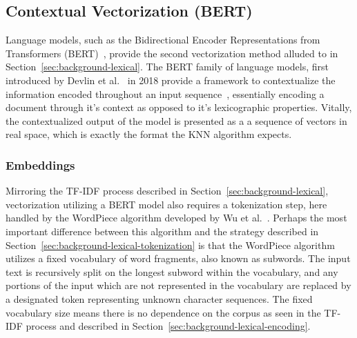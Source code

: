 \documentclass[11pt]{article}
\theoremstyle{plain}
\theoremstyle{definition}
\begin{document}
\subsection{Contextual Vectorization (BERT)}\label{sec:background-contextual}

Language models, such as the Bidirectional Encoder Representations from Transformers (BERT)~\cite{devlin/2018/bert}, provide the second vectorization method alluded to in Section~\ref{sec:background-lexical}. The BERT family of language models, first introduced by Devlin et al.\ \cite{devlin/2018/bert} in 2018 provide a framework to contextualize the information encoded throughout an input sequence~\cite{jurafsky/2026/speech}, essentially encoding a document through it's context as opposed to it's lexicographic properties. Vitally, the contextualized output of the model is presented as a a sequence of vectors in real space, which is exactly the format the KNN algorithm expects.

\subsubsection{Embeddings}\label{sec:background-contextual-embeddings}

Mirroring the TF-IDF process described in Section~\ref{sec:background-lexical}, vectorization utilizing a BERT model also requires a tokenization step, here handled by the WordPiece algorithm developed by Wu et al.\ \cite{wu/2016/googles}. Perhaps the most important difference between this algorithm and the strategy described in Section~\ref{sec:background-lexical-tokenization} is that the WordPiece algorithm utilizes a fixed vocabulary of word fragments, also known as subwords. The input text is recursively split on the longest subword within the vocabulary, and any portions of the input which are not represented in the vocabulary are replaced by a designated token representing unknown character sequences. The fixed vocabulary size means there is no dependence on the corpus as seen in the TF-IDF process and described in Section~\ref{sec:background-lexical-encoding}.
\end{document}
